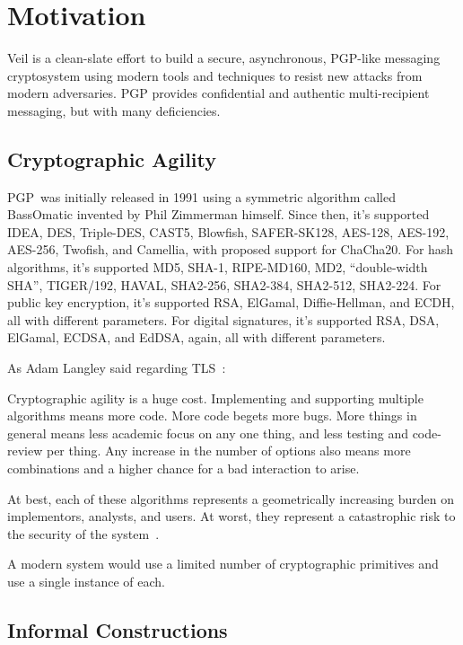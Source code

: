 \section{Motivation}\label{sec:motivation}

Veil is a clean-slate effort to build a secure, asynchronous, PGP-like messaging cryptosystem using modern tools and
techniques to resist new attacks from modern adversaries.
PGP provides confidential and authentic multi-recipient messaging, but with many deficiencies.

\subsection{Cryptographic Agility}\label{subsec:cryptographic-agility}

PGP~was initially released in 1991 using a symmetric algorithm called BassOmatic invented by Phil
Zimmerman himself.
Since then, it's supported IDEA, DES, Triple-DES, CAST5, Blowfish,
SAFER-SK128, AES-128, AES-192, AES-256, Twofish, and Camellia,
with proposed support for ChaCha20.
For hash algorithms, it's supported MD5, SHA-1, RIPE-MD160, MD2, ``double-width SHA'', TIGER/192, HAVAL, SHA2-256,
SHA2-384, SHA2-512, SHA2-224.
For public key encryption, it's supported RSA, ElGamal, Diffie-Hellman, and ECDH, all with different parameters.
For digital signatures, it's supported RSA, DSA, ElGamal, ECDSA, and EdDSA, again, all with different parameters.

As Adam Langley said regarding TLS~\cite{langley2016}:

\begin{displayquote}
    Cryptographic agility is a huge cost.
    Implementing and supporting multiple algorithms means more code.
    More code begets more bugs.
    More things in general means less academic focus on any one thing, and less testing and code-review per thing.
    Any increase in the number of options also means more combinations and a higher chance for a bad interaction to
    arise.
\end{displayquote}

At best, each of these algorithms represents a geometrically increasing burden on implementors, analysts, and users.
At worst, they represent a catastrophic risk to the security of the system~\cite{nguyen2004, blessing2021}.

A modern system would use a limited number of cryptographic primitives and use a single instance of each.

\subsection{Informal Constructions}\label{subsec:informal-constructions}

